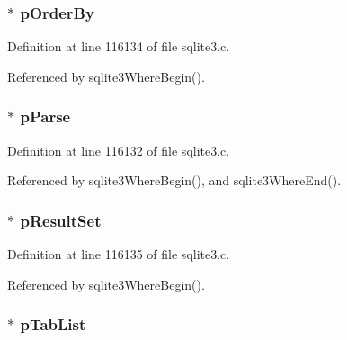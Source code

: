 \subsubsection[{p\+Order\+By}]{$\ast$ p\+Order\+By}\label{struct_where_info_a9150e506e5902e336130c9764caf96a0}


Definition at line 116134 of file sqlite3.\+c.



Referenced by sqlite3\+Where\+Begin().

\hypertarget{struct_where_info_ac700bf257b32cd7e491fde90a081379d}{}
\subsubsection[{p\+Parse}]{$\ast$ p\+Parse}\label{struct_where_info_ac700bf257b32cd7e491fde90a081379d}


Definition at line 116132 of file sqlite3.\+c.



Referenced by sqlite3\+Where\+Begin(), and sqlite3\+Where\+End().

\hypertarget{struct_where_info_a0b2d06815787b3b4fcded5087620da78}{}
\subsubsection[{p\+Result\+Set}]{$\ast$ p\+Result\+Set}\label{struct_where_info_a0b2d06815787b3b4fcded5087620da78}


Definition at line 116135 of file sqlite3.\+c.



Referenced by sqlite3\+Where\+Begin().

\hypertarget{struct_where_info_a1674d2e1df2aef30ab34fca8ba9fadf2}{}
\subsubsection[{p\+Tab\+List}]{$\ast$ p\+Tab\+List}\label{struct_where_info_a1674d2e1df2aef30ab34fca8ba9fadf2}



